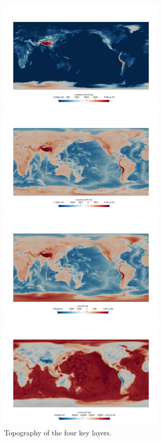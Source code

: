 \begin{center}
\includegraphics[width=8cm]{python_codes/fieldstone_99/images/continental}
\includegraphics[width=8cm]{python_codes/fieldstone_99/images/bedrock}\\
\includegraphics[width=8cm]{python_codes/fieldstone_99/images/ice}
\includegraphics[width=8cm]{python_codes/fieldstone_99/images/moho}\\
{\captionfont Topography of the four key layers.}
\end{center}

